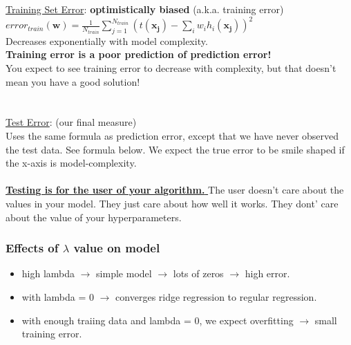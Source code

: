 \underline{Training Set Error}:  \textbf{optimistically biased}  (a.k.a. training error) \hfill \\
$\displaystyle  error_{train}(\bm{w}) = \frac{1}{N_{train}} \sum_{j=1}^{N_{train}}(t(\bm{x_j})-\sum_{i} w_i h_i(\bm{x_j}))^2$ \hfill \\
Decreases exponentially with model complexity.   \hfill \\
\textbf{Training error is a poor prediction of prediction error!} \hfill \\
You expect to see training error to decrease with complexity, but that doesn't mean you have a good solution!  \hfill \\
\hfill \\  \hfill \\


\underline{Test Error}: (our final measure)  \hfill \\
Uses the same formula as prediction error, except that we have never observed the test data.  See formula below. 
We expect the true error to be smile shaped if the x-axis is model-complexity. 
\hfill \\ \hfill \\

\underline{\textbf{Testing is for the user of your algorithm. }}
The user doesn't care about the values in your model.  They just care about how well it works.  
 They dont' care about the value of your hyperparameters. 


\subsubsection{Effects of $\lambda$ value on model}
 \begin{itemize}
 	\item high lambda $\rightarrow$ simple model $\rightarrow$ lots of zeros $\rightarrow$ high error. 
	\item with lambda = 0 $\rightarrow$ converges ridge regression to regular regression. 
	\item with enough traiing data and lambda = 0, we expect overfitting $\rightarrow$ small training error. 
\end{itemize}

